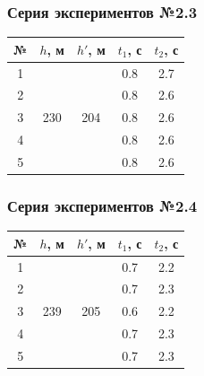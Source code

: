 \documentclass[12pt,a4paper]{article}
\begin{document}
\subsubsection*{Серия экспериментов №2.3}
\begin{tabular}{|c|c|c|c|c|}
    \hline
    № & $h$, м               & $h'$, м              & $t_1$, с & $t_2$, с \\
    \hline
    1 & \multirow{5}{*}{230} & \multirow{5}{*}{204} & 0.8      & 2.7      \\
    \cline{1-1} \cline{4-5} 
    2 &                      &                      & 0.8      & 2.6      \\
    \cline{1-1} \cline{4-5} 
    3 &                      &                      & 0.8      & 2.6      \\
    \cline{1-1} \cline{4-5} 
    4 &                      &                      & 0.8      & 2.6      \\
    \cline{1-1} \cline{4-5} 
    5 &                      &                      & 0.8      & 2.6      \\
    \hline
\end{tabular}
\subsubsection*{Серия экспериментов №2.4}
\begin{tabular}{|c|c|c|c|c|}
    \hline
    № & $h$, м               & $h'$, м              & $t_1$, с & $t_2$, с \\
    \hline
    1 & \multirow{5}{*}{239} & \multirow{5}{*}{205} & 0.7      & 2.2      \\
    \cline{1-1} \cline{4-5} 
    2 &                      &                      & 0.7      & 2.3      \\
    \cline{1-1} \cline{4-5} 
    3 &                      &                      & 0.6      & 2.2      \\
    \cline{1-1} \cline{4-5} 
    4 &                      &                      & 0.7      & 2.3      \\
    \cline{1-1} \cline{4-5} 
    5 &                      &                      & 0.7      & 2.3      \\
    \hline
\end{tabular}
\end{document}
